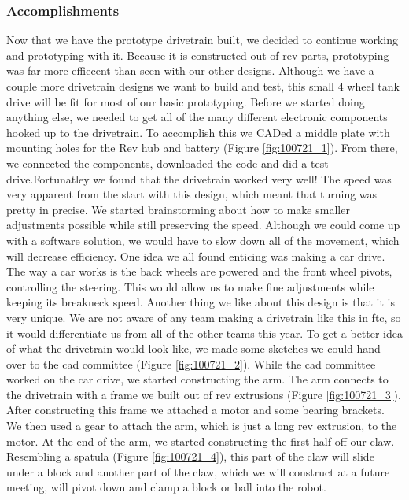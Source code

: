 \subsubsection*{Accomplishments}
Now that we have the prototype drivetrain built, we decided to continue working and prototyping with it. Because it is constructed out of rev parts, prototyping was far more effiecent than seen with our other designs. Although we have a couple more drivetrain designs we want to build and test, this small 4 wheel tank drive will be fit for most of our basic prototyping. Before we started doing anything else, we needed to get all of the many different electronic components hooked up to the drivetrain. To accomplish this we CADed a middle plate with mounting holes for the Rev hub and battery (Figure \ref{fig:100721_1}). From there, we connected the components, downloaded the code and did a test drive.Fortunatley we found that the drivetrain worked very well! The speed was very apparent from the start with this design, which meant that turning was pretty in precise. We started brainstorming about how to make smaller adjustments possible while still preserving the speed. Although we could come up with a software solution, we would have to slow down all of the movement, which will decrease efficiency. One idea we all found enticing was making a car drive. The way a car works is the back wheels are powered and the front wheel pivots, controlling the steering. This would allow us to make fine adjustments while keeping its breakneck speed. Another thing we like about this design is that it is very unique. We are not aware of any team making a drivetrain like this in ftc, so it would differentiate us from all of the other teams this year. To get a better idea of what the drivetrain would look like, we made some sketches we could hand over to the cad committee (Figure \ref{fig:100721_2}).
While the cad committee worked on the car drive, we started constructing the arm. The arm connects to the drivetrain with a frame we built out of rev extrusions (Figure \ref{fig:100721_3}). After constructing this frame we attached a motor and some bearing brackets. We then used a gear to attach the arm, which is just a long rev extrusion, to the motor. At the end of the arm, we started constructing the first half off our claw. Resembling a spatula (Figure \ref{fig:100721_4}), this part of the claw will slide under a block and another part of the claw, which we will construct at a future meeting, will pivot down and clamp a block or ball into the robot.
 

